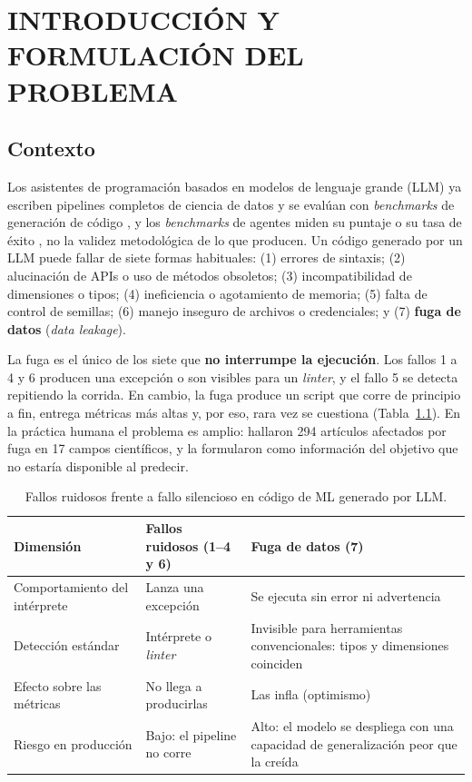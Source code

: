 
\chapter{INTRODUCCIÓN Y FORMULACIÓN DEL PROBLEMA}
\label{ch:introduccion}

\section{Contexto}

Los asistentes de programación basados en modelos de lenguaje grande (LLM) ya escriben pipelines completos de ciencia de datos \parencite{hong2025} y se evalúan con \emph{benchmarks} de generación de código \parencite{lai2023}, y los \emph{benchmarks} de agentes miden su puntaje o su tasa de éxito \parencite{chan2025,huang2024}, no la validez metodológica de lo que producen. Un código generado por un LLM puede fallar de siete formas habituales: (1) errores de sintaxis; (2) alucinación de APIs o uso de métodos obsoletos; (3) incompatibilidad de dimensiones o tipos; (4) ineficiencia o agotamiento de memoria; (5) falta de control de semillas; (6) manejo inseguro de archivos o credenciales; y (7) \textbf{fuga de datos} (\emph{data leakage}).

La fuga es el único de los siete que \textbf{no interrumpe la ejecución}. Los fallos 1 a 4 y 6 producen una excepción o son visibles para un \emph{linter}, y el fallo 5 se detecta repitiendo la corrida. En cambio, la fuga produce un script que corre de principio a fin, entrega métricas más altas y, por eso, rara vez se cuestiona (Tabla~\ref{tab:ruidoso}). En la práctica humana el problema es amplio: \textcite{kapoor2023} hallaron 294 artículos afectados por fuga en 17 campos científicos, y \textcite{kaufman2012} la formularon como información del objetivo que no estaría disponible al predecir.

\begin{table}[!htbp]
\centering
\caption{Fallos ruidosos frente a fallo silencioso en código de ML generado por LLM.}
\label{tab:ruidoso}
\begingroup\footnotesize\singlespacing
\begin{tabular}{@{}p{3.4cm} p{4.6cm} p{7.4cm}@{}}
\toprule
Dimensión & Fallos ruidosos (1--4 y 6) & Fuga de datos (7) \\
\midrule
Comportamiento del intérprete & Lanza una excepción & Se ejecuta sin error ni advertencia \\
Detección estándar & Intérprete o \emph{linter} & Invisible para herramientas convencionales: tipos y dimensiones coinciden \\
Efecto sobre las métricas & No llega a producirlas & Las infla (optimismo) \\
Riesgo en producción & Bajo: el pipeline no corre & Alto: el modelo se despliega con una capacidad de generalización peor que la creída \\
\bottomrule
\end{tabular}
\endgroup
\end{table}

